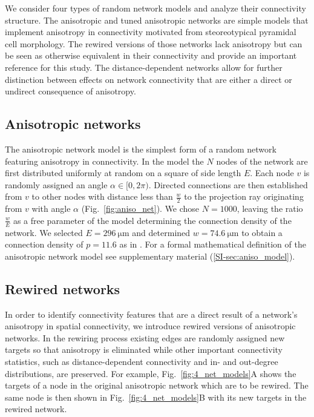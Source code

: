 
We consider four types of random network models and analyze their
connectivity structure. The anisotropic and tuned anisotropic networks
are simple models that implement anisotropy in connectivity motivated
from steoreotypical pyramidal cell morphology. The rewired versions of
those networks lack anisotropy but can be seen as otherwise equivalent
in their connectivity and provide an important reference for this
study. The distance-dependent networks allow for further distinction
between effects on network connectivity that are either a direct or
undirect consequence of anisotropy.

\subsection*{Anisotropic networks}

The anisotropic network model is the simplest form of a random network
featuring anisotropy in connectivity. In the model the $N$ nodes of
the network are first distributed uniformly at random on a square of
side length $E$. Each node $v$ is randomly assigned an angle
$\alpha \in [0,2\pi)$. Directed connections are then established from
$v$ to other nodes with distance less than $\frac{w}{2}$ to the
projection ray originating from $v$ with angle $\alpha$
(Fig.~\ref{fig:aniso_net}). We chose $N=1000$, leaving the ratio
$\frac{w}{E}$ as a free parameter of the model determining the
connection density of the network. We selected
$E=\SI{296}{\micro\meter}$ and determined $w=\SI{74.6}%
{\micro\meter}$ to obtain a connection density of $p=11.6$ as in
\cite{Song2005}. For a formal mathematical definition of the
anisotropic network model see supplementary material
(\ref{SI-sec:aniso_model}).






\bigskip

\subsection*{Rewired networks}
%
In order to identify connectivity features that are a direct result of
a network's anisotropy in spatial connectivity, we introduce rewired
versions of anisotropic networks. In the rewiring process existing
edges are randomly assigned new targets so that anisotropy is
eliminated while other important connectivity statistics, such as
distance-dependent connectivity and in- and out-degree distributions,
are preserved. For example, Fig.~\ref{fig:4_net_models}A shows the
targets of a node in the original anisotropic network which are to be
rewired. The same node is then shown in Fig.~\ref{fig:4_net_models}B
with its new targets in the rewired network.
%

